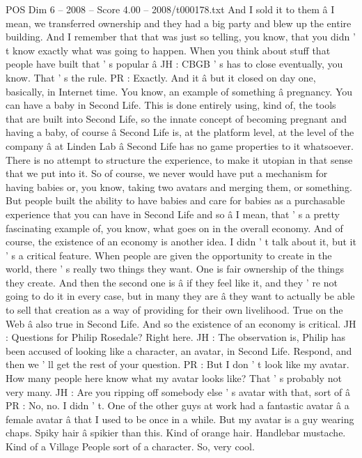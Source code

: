 \begin{textsample}{POS Dim 6 – 2008 – Score 4.00 – 2008/t000178.txt}
And I sold it to them â I mean, we transferred ownership and they had a big party and blew up the entire building.
And I remember that that was just so telling, you know, that you didn ' t know exactly what was going to happen.
When you think about stuff that people have built that ' s popular â JH : CBGB ' s has to close eventually, you know.
That ' s the rule.
PR : Exactly.
And it â but it closed on day one, basically, in Internet time.
You know, an example of something â pregnancy.
You can have a baby in Second Life.
This is done entirely using, kind of, the tools that are built into Second Life, so the innate concept of becoming pregnant and having a baby, of course â Second Life is, at the platform level, at the level of the company â at Linden Lab â Second Life has no game properties to it whatsoever.
There is no attempt to structure the experience, to make it utopian in that sense that we put into it.
So of course, we never would have put a mechanism for having babies or, you know, taking two avatars and merging them, or something.
But people built the ability to have babies and care for babies as a purchasable experience that you can have in Second Life and so â I mean, that ' s a pretty fascinating example of, you know, what goes on in the overall economy.
And of course, the existence of an economy is another idea.
I didn ' t talk about it, but it ' s a critical feature.
When people are given the opportunity to create in the world, there ' s really two things they want.
One is fair ownership of the things they create.
And then the second one is â if they feel like it, and they ' re not going to do it in every case, but in many they are â they want to actually be able to sell that creation as a way of providing for their own livelihood.
True on the Web â also true in Second Life.
And so the existence of an economy is critical.
JH : Questions for Philip Rosedale?
Right here.
JH : The observation is, Philip has been accused of looking like a character, an avatar, in Second Life.
Respond, and then we ' ll get the rest of your question.
PR : But I don ' t look like my avatar.
How many people here know what my avatar looks like?
That ' s probably not very many.
JH : Are you ripping off somebody else ' s avatar with that, sort of â PR : No, no.
I didn ' t.
One of the other guys at work had a fantastic avatar â a female avatar â that I used to be once in a while.
But my avatar is a guy wearing chaps.
Spiky hair â spikier than this.
Kind of orange hair.
Handlebar mustache.
Kind of a Village People sort of a character.
So, very cool.

\end{textsample}
